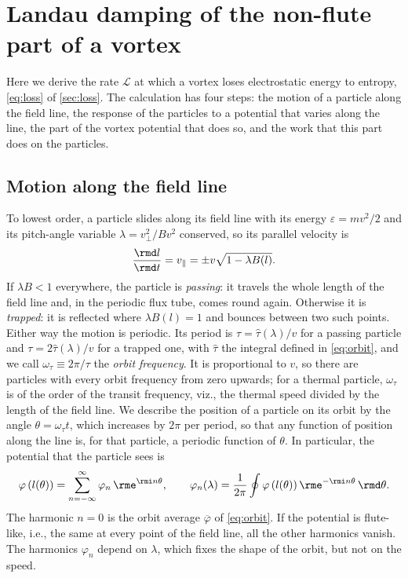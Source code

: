 \section{Landau damping of the non-flute part of a vortex}\label{app:landau}

Here we derive the rate \(\mathcal{L}\) at which a vortex loses electrostatic energy to entropy, \cref{eq:loss} of \cref{sec:loss}. The calculation has four steps: the motion of a particle along the field line, the response of the particles to a potential that varies along the line, the part of the vortex potential that does so, and the work that this part does on the particles.

\subsection{Motion along the field line}

To lowest order, a particle slides along its field line with its energy \(\varepsilon = mv^2/2\) and its pitch-angle variable \(\lambda = v_\perp^2/Bv^2\) conserved, so its parallel velocity is
\begin{equation}
\frac{\rmd l}{\rmd t} = v_\parallel = \pm v\sqrt{1 - \lambda B(l)}.
\label{eq:Horbit}
\end{equation}
If \(\lambda B < 1\) everywhere, the particle is \textit{passing}: it travels the whole length of the field line and, in the periodic flux tube, comes round again. Otherwise it is \textit{trapped}: it is reflected where \(\lambda B(l) = 1\) and bounces between two such points. Either way the motion is periodic. Its period is \(\tau = \hat\tau(\lambda)/v\) for a passing particle and \(\tau = 2\hat\tau(\lambda)/v\) for a trapped one, with \(\hat\tau\) the integral defined in \cref{eq:orbit}, and we call \(\omega_\tau \equiv 2\pi/\tau\) the \textit{orbit frequency}. It is proportional to \(v\), so there are particles with every orbit frequency from zero upwards; for a thermal particle, \(\omega_\tau\) is of the order of the transit frequency, viz., the thermal speed divided by the length of the field line. We describe the position of a particle on its orbit by the angle \(\theta = \omega_\tau t\), which increases by \(2\pi\) per period, so that any function of position along the line is, for that particle, a periodic function of \(\theta\). In particular, the potential that the particle sees is
\begin{equation}
\varphi\left(l(\theta)\right) = \sum_{n=-\infty}^{\infty}\varphi_n\,\rme^{\rmi n\theta},
\qquad
\varphi_n(\lambda) = \frac{1}{2\pi}\oint\varphi\left(l(\theta)\right)\rme^{-\rmi n\theta}\,\rmd\theta .
\label{eq:Hharmonics}
\end{equation}
The harmonic \(n = 0\) is the orbit average \(\overline\varphi\) of \cref{eq:orbit}. If the potential is flute-like, i.e., the same at every point of the field line, all the other harmonics vanish. The harmonics \(\varphi_n\) depend on \(\lambda\), which fixes the shape of the orbit, but not on the speed.

